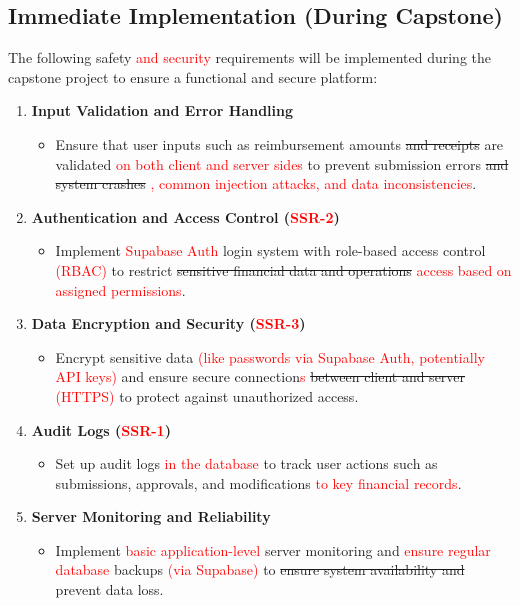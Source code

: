 \documentclass{article}
\begin{document}
\subsection{Immediate Implementation (During Capstone)}

The following safety \textcolor{red}{and security} requirements will be implemented during the capstone project to ensure a functional and secure platform:

\begin{enumerate}
    \item \textbf{Input Validation and Error Handling}
    \begin{itemize}
        \item Ensure that user inputs such as reimbursement amounts \sout{and receipts} are validated \textcolor{red}{on both client and server sides} to prevent submission errors \sout{and system crashes} \textcolor{red}{, common injection attacks, and data inconsistencies}.
    \end{itemize}

    \item \textbf{Authentication and Access Control (\textcolor{red}{SSR-2})}
    \begin{itemize}
        \item Implement \textcolor{red}{Supabase Auth} login system with role-based access control \textcolor{red}{(RBAC)} to restrict \sout{sensitive financial data and operations} \textcolor{red}{access based on assigned permissions}.
    \end{itemize}

    \item \textbf{Data Encryption and Security (\textcolor{red}{SSR-3})}
    \begin{itemize}
        \item Encrypt sensitive data \textcolor{red}{(like passwords via Supabase Auth, potentially API keys)} and ensure secure connection\textcolor{red}{s} \sout{between client and server} \textcolor{red}{(HTTPS)} to protect against unauthorized access.
    \end{itemize}

    \item \textbf{Audit Logs (\textcolor{red}{SSR-1})}
    \begin{itemize}
        \item Set up audit logs \textcolor{red}{in the database} to track user actions such as submissions, approvals, and modifications \textcolor{red}{to key financial records}.
    \end{itemize}

    \item \textbf{Server Monitoring and Reliability}
    \begin{itemize}
        \item Implement \textcolor{red}{basic application-level} server monitoring and \textcolor{red}{ensure regular database} backups \textcolor{red}{(via Supabase)} to \sout{ensure system availability and} prevent data loss.
    \end{itemize}

\end{enumerate}
\end{document}
